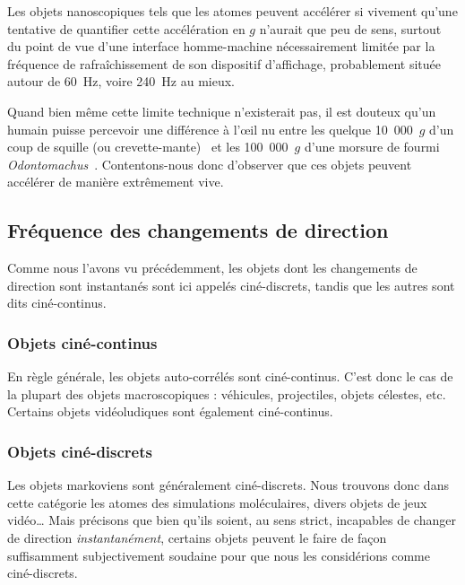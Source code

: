 	\addtocounter{footnote}{-1}
	\addtocounter{footnote}{1}
	
	Les objets nanoscopiques tels que les atomes peuvent accélérer si vivement qu'une tentative de quantifier cette accélération en $g$ n'aurait que peu de sens, surtout du point de vue d'une interface homme-machine nécessairement limitée par la fréquence de rafraîchissement de son dispositif d'affichage, probablement située autour de 60~Hz, voire 240~Hz au mieux\footnotemark{}.
	
	
	Quand bien même cette limite technique n'existerait pas, il est douteux qu'un humain puisse percevoir une différence à l'œil nu entre les quelque 10~000~$g$ d'un coup de squille (ou crevette-mante)~\cite{patek2004biomechanics} et les 100~000~$g$ d'une morsure de fourmi \emph{Odontomachus}~\cite{patek2006multifunctionality}. Contentons-nous donc d'observer que ces objets peuvent accélérer de manière extrêmement vive.
	
	\subsection{Fréquence des changements de direction}
	Comme nous l'avons vu précédemment, les objets dont les changements de direction sont instantanés sont ici appelés ciné-discrets, tandis que les autres sont dits ciné-continus.
	
	\subsubsection{Objets ciné-continus}
	En règle générale, les objets auto-corrélés sont ciné-continus. C'est donc le cas de la plupart des objets macroscopiques : véhicules, projectiles, objets célestes, etc. Certains objets vidéoludiques sont également ciné-continus.
	
	\subsubsection{Objets ciné-discrets}
	Les objets markoviens sont généralement ciné-discrets. Nous trouvons donc dans cette catégorie les atomes des simulations moléculaires, divers objets de jeux vidéo\ldots{} Mais précisons que bien qu'ils soient, au sens strict, incapables de changer de direction \emph{instantanément}, certains objets peuvent le faire de façon suffisamment subjectivement soudaine pour que nous les considérions comme ciné-discrets.
	
